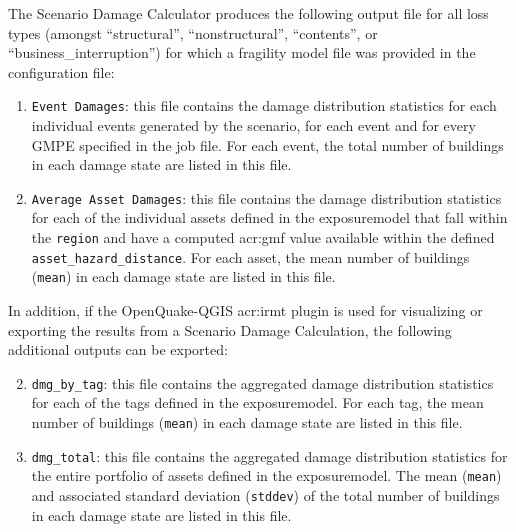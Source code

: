 The Scenario Damage Calculator produces the following output file for
all loss types (amongst ``structural'', ``nonstructural'', ``contents'', or
``business\_interruption'') for which a fragility model file was provided in
the configuration file:

\begin{enumerate}

  \item \Verb+Event Damages+: this file contains the damage distribution
    statistics for each individual events generated by the scenario, 
    for each event and for every GMPE specified in the job file. For each
    event, the total number of buildings in each damage state are listed in 
    this file.

  \item \Verb+Average Asset Damages+: this file contains the damage distribution
    statistics for each of the individual \glspl{asset} defined in the
    \gls{exposuremodel} that fall within the \Verb+region+ and have
    a computed \gls{acr:gmf} value available within the defined
    \Verb+asset_hazard_distance+. For each \gls{asset}, the mean number of
    buildings (\Verb+mean+) in each damage state are listed in this file.

\end{enumerate}

In addition, if the OpenQuake-QGIS \gls{acr:irmt} plugin is used for
visualizing or exporting the results from a Scenario Damage Calculation, the
following additional outputs can be exported:

\begin{enumerate}
\setcounter{enumi}{1}

  \item \Verb+dmg_by_tag+: this file contains the aggregated damage
    distribution statistics for each of the \glspl{tag} defined in the
    \gls{exposuremodel}. For each \gls{tag}, the mean number of
    buildings (\Verb+mean+) in each damage state are listed in this file.

  \item \Verb+dmg_total+: this file contains the aggregated damage
    distribution statistics for the entire portfolio of \glspl{asset} defined
    in the \gls{exposuremodel}. The mean (\Verb+mean+) and associated standard
    deviation (\Verb+stddev+) of the total number of buildings in each
    damage state are listed in this file.

\end{enumerate}

